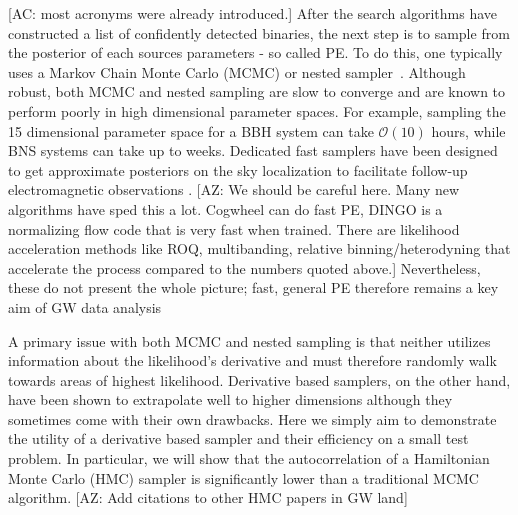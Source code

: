 \documentclass[twocolumn]{aastex631}
\newcommand{\AZ}[1]{{\color{Burnt}[AZ: #1]}}
\newcommand{\amc}[1]{{\color{red}[AC: #1]}}
\begin{document}
\amc{most acronyms were already introduced.}
After the search algorithms have constructed a list of confidently detected binaries, the next step is to sample from the posterior of each sources parameters - so called PE.
To do this, one typically uses a Markov Chain Monte Carlo (MCMC) or nested sampler~\citep{Skilling2004, multinest, dynesty}.
Although robust, both MCMC and nested sampling are slow to converge and are known to perform poorly in high dimensional parameter spaces.
For example, sampling the 15 dimensional parameter space for a BBH system can take $\mathcal{O}(10)$ hours, while BNS systems can take up to weeks.
Dedicated fast samplers have been designed to get approximate posteriors on the sky localization to facilitate follow-up electromagnetic observations \citep[e.g.~\texttt{BAYESTAR}][]{Singer:2015ema}.
\AZ{We should be careful here. Many new algorithms have sped this a lot. Cogwheel can do fast PE, DINGO is a normalizing flow code that is very fast when trained. There are likelihood acceleration methods like ROQ, multibanding, relative binning/heterodyning that accelerate the process compared to the numbers quoted above.}
Nevertheless, these do not present the whole picture; fast, general PE therefore remains a key aim of GW data analysis

A primary issue with both MCMC and nested sampling is that neither utilizes information about the likelihood's derivative and must therefore randomly walk towards areas of highest likelihood.
Derivative based samplers, on the other hand, have been shown to extrapolate well to higher dimensions although they sometimes come with their own drawbacks.
Here we simply aim to demonstrate the utility of a derivative based sampler and their efficiency on a small test problem.
In particular, we will show that the autocorrelation of a Hamiltonian Monte Carlo (HMC) sampler is significantly lower than a traditional MCMC algorithm.
\AZ{Add citations to other HMC papers in GW land}
\end{document}

